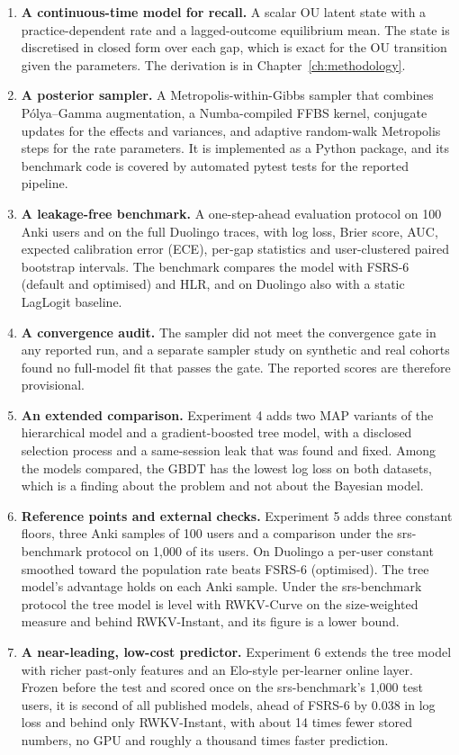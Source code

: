 \begin{enumerate}
  \item \textbf{A continuous-time model for recall.} A scalar OU latent state with a practice-dependent
    rate and a lagged-outcome equilibrium mean. The state is discretised in closed form over each
    gap, which is exact for the OU transition given the parameters. The derivation is in
    Chapter~\ref{ch:methodology}.
  \item \textbf{A posterior sampler.} A Metropolis-within-Gibbs sampler that combines P\'olya--Gamma
    augmentation, a Numba-compiled FFBS kernel, conjugate updates for the effects and variances, and
    adaptive random-walk Metropolis steps for the rate parameters. It is implemented as a Python
    package, and its benchmark code is covered by \NumBenchTests{} automated pytest tests for the reported pipeline.
  \item \textbf{A leakage-free benchmark.} A one-step-ahead evaluation protocol on 100 Anki users and on the full Duolingo traces, with
    log loss, Brier score, AUC, expected calibration error (ECE), per-gap statistics and
    user-clustered paired bootstrap intervals. The benchmark compares the model with FSRS-6 (default and optimised) and HLR, and on Duolingo also with a static LagLogit baseline.
  \item \textbf{A convergence audit.} The sampler did not meet the convergence gate in any reported run, and a separate sampler study on synthetic and real cohorts found no full-model fit that
    passes the gate. The reported scores are therefore provisional.
  \item \textbf{An extended comparison.} Experiment 4 adds two MAP variants of the hierarchical model and a gradient-boosted tree model, with a disclosed selection process and a same-session leak that was found and fixed. Among the models compared, the GBDT has the lowest log loss on both datasets, which is a finding about the problem and not about the Bayesian model.
  \item \textbf{Reference points and external checks.} Experiment 5 adds three constant floors, three Anki samples of 100 users and a comparison under the srs-benchmark protocol on 1,000 of its users. On Duolingo a per-user constant smoothed toward the population rate beats FSRS-6 (optimised). The tree model's advantage holds on each Anki sample. Under the srs-benchmark protocol the tree model is level with RWKV-Curve on the size-weighted measure and behind RWKV-Instant, and its figure is a lower bound.
  \item \textbf{A near-leading, low-cost predictor.} Experiment 6 extends the tree model with richer past-only features and an Elo-style per-learner online layer. Frozen before the test and scored once on the srs-benchmark's 1,000 test users, it is second of all published models, ahead of FSRS-6 by 0.038 in log loss and behind only RWKV-Instant, with about 14 times fewer stored numbers, no GPU and roughly a thousand times faster prediction.
\end{enumerate}

